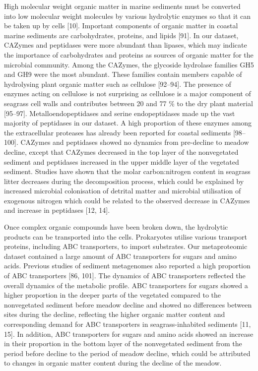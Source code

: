 \documentclass[
  12 pt,
]{article}
\begin{document}
High molecular weight organic matter in marine sediments must be converted into low molecular weight molecules by various hydrolytic enzymes so that it can be taken up by cells {[}10{]}. Important components of organic matter in coastal marine sediments are carbohydrates, proteins, and lipids {[}91{]}. In our dataset, CAZymes and peptidases were more abundant than lipases, which may indicate the importance of carbohydrates and proteins as sources of organic matter for the microbial community. Among the CAZymes, the glycoside hydrolase families GH5 and GH9 were the most abundant. These families contain members capable of hydrolysing plant organic matter such as cellulose {[}92--94{]}. The presence of enzymes acting on cellulose is not surprising as cellulose is a major component of seagrass cell walls and contributes between 20 and 77 \si{\percent} to the dry plant material {[}95--97{]}. Metalloendopeptidases and serine endopeptidases made up the vast majority of peptidases in our dataset. A high proportion of these enzymes among the extracellular proteases has already been reported for coastal sediments {[}98--100{]}. CAZymes and peptidases showed no dynamics from pre-decline to meadow decline, except that CAZymes decreased in the top layer of the nonvegetated sediment and peptidases increased in the upper middle layer of the vegetated sediment. Studies have shown that the molar carbon:nitrogen content in seagrass litter decreases during the decomposition process, which could be explained by increased microbial colonisation of detrital matter and microbial utilisation of exogenous nitrogen which could be related to the observed decrease in CAZymes and increase in peptidases {[}12, 14{]}.

Once complex organic compounds have been broken down, the hydrolytic products can be transported into the cells. Prokaryotes utilise various transport proteins, including ABC transporters, to import substrates. Our metaproteomic dataset contained a large amount of ABC transporters for sugars and amino acids. Previous studies of sediment metagenomes also reported a high proportion of ABC transporters {[}86, 101{]}. The dynamics of ABC transporters reflected the overall dynamics of the metabolic profile. ABC transporters for sugars showed a higher proportion in the deeper parts of the vegetated compared to the nonvegetated sediment before meadow decline and showed no differences between sites during the decline, reflecting the higher organic matter content and corresponding demand for ABC transporters in seagrass-inhabited sediments {[}11, 15{]}. In addition, ABC transporters for sugars and amino acids showed an increase in their proportion in the bottom layer of the nonvegetated sediment from the period before decline to the period of meadow decline, which could be attributed to changes in organic matter content during the decline of the meadow.
\end{document}
